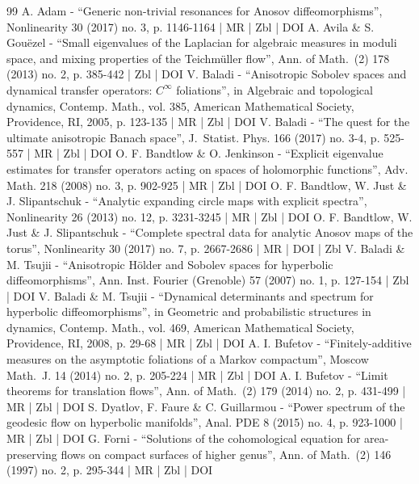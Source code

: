 \documentclass[10pt]{amsart}
\theoremstyle{definition}
\numberwithin{equation}{section}
\begin{document}
\begin{thebibliography}{99}
A. Adam - “Generic non-trivial resonances for Anosov diffeomorphisms”, Nonlinearity 30 (2017) no. 3, p. 1146-1164 | MR | Zbl | DOI
A. Avila \& S. Gouëzel - “Small eigenvalues of the Laplacian for algebraic measures in moduli space, and mixing properties of the Teichmüller flow”, Ann. of Math. (2) 178 (2013) no. 2, p. 385-442 | Zbl | DOI
V. Baladi - “Anisotropic Sobolev spaces and dynamical transfer operators: $C^\infty $ foliations”, in Algebraic and topological dynamics, Contemp. Math., vol. 385, American Mathematical Society, Providence, RI, 2005, p. 123-135 | MR | Zbl | DOI
V. Baladi - “The quest for the ultimate anisotropic Banach space”, J. Statist. Phys. 166 (2017) no. 3-4, p. 525-557 | MR | Zbl | DOI
O. F. Bandtlow \& O. Jenkinson - “Explicit eigenvalue estimates for transfer operators acting on spaces of holomorphic functions”, Adv. Math. 218 (2008) no. 3, p. 902-925 | MR | Zbl | DOI
O. F. Bandtlow, W. Just \& J. Slipantschuk - “Analytic expanding circle maps with explicit spectra”, Nonlinearity 26 (2013) no. 12, p. 3231-3245 | MR | Zbl | DOI
O. F. Bandtlow, W. Just \& J. Slipantschuk - “Complete spectral data for analytic Anosov maps of the torus”, Nonlinearity 30 (2017) no. 7, p. 2667-2686 | MR | DOI | Zbl
V. Baladi \& M. Tsujii - “Anisotropic Hölder and Sobolev spaces for hyperbolic diffeomorphisms”, Ann. Inst. Fourier (Grenoble) 57 (2007) no. 1, p. 127-154 | Zbl | DOI
V. Baladi \& M. Tsujii - “Dynamical determinants and spectrum for hyperbolic diffeomorphisms”, in Geometric and probabilistic structures in dynamics, Contemp. Math., vol. 469, American Mathematical Society, Providence, RI, 2008, p. 29-68 | MR | Zbl | DOI
A. I. Bufetov - “Finitely-additive measures on the asymptotic foliations of a Markov compactum”, Moscow Math. J. 14 (2014) no. 2, p. 205-224 | MR | Zbl | DOI
A. I. Bufetov - “Limit theorems for translation flows”, Ann. of Math. (2) 179 (2014) no. 2, p. 431-499 | MR | Zbl | DOI
S. Dyatlov, F. Faure \& C. Guillarmou - “Power spectrum of the geodesic flow on hyperbolic manifolds”, Anal. PDE 8 (2015) no. 4, p. 923-1000 | MR | Zbl | DOI
G. Forni - “Solutions of the cohomological equation for area-preserving flows on compact surfaces of higher genus”, Ann. of Math. (2) 146 (1997) no. 2, p. 295-344 | MR | Zbl | DOI

\end{thebibliography}
\end{document}
